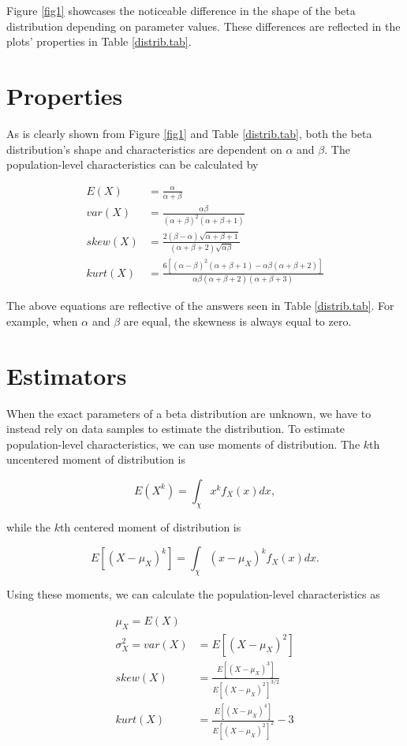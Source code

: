 \documentclass{article}\usepackage[]{graphicx}\usepackage[]{xcolor}
\begin{document}
\begin{multicols}{2}
Figure \ref{fig1} showcases the noticeable difference in the shape of the beta distribution depending on parameter values. These differences are reflected in the plots' properties in Table \ref{distrib.tab}. 


\section{Properties}
As is clearly shown from Figure \ref{fig1} and Table \ref{distrib.tab}, both the beta distribution's shape and characteristics are dependent on $\alpha$ and $\beta$. The population-level characteristics can be calculated by

\begin{align*}
E(X) &= \frac{\alpha}{\alpha + \beta} \tag{The Mean} \\
var(X) &= \frac{\alpha\beta}{(\alpha + \beta)^2(\alpha + \beta + 1)} \tag{The variance} \\
skew(X) &= \frac{2(\beta-\alpha)\sqrt{\alpha + \beta + 1}}{(\alpha + \beta + 2)\sqrt{\alpha\beta}} \tag{The Skewness} \\
kurt(X) &= \frac{6[(\alpha-\beta)^2(\alpha+\beta+1)-\alpha\beta(\alpha+\beta+2)]}{\alpha\beta(\alpha+\beta+2)(\alpha+\beta+3)} \tag{The Excess Kurtosis}
\end{align*}

The above equations are reflective of the answers seen in Table \ref{distrib.tab}. For example, when $\alpha$ and $\beta$ are equal, the skewness is always equal to zero.

\section{Estimators}
When the exact parameters of a beta distribution are unknown, we have to instead rely on data samples to estimate the distribution. To estimate population-level characteristics, we can use moments of distribution. The $k$th uncentered moment of distribution is 

\[E(X^k) = \int_\chi x^kf_X(x)dx,\]

while the $k$th centered moment of distribution is

\[E[(X-\mu_X)^k] = \int_\chi (x-\mu_X)^kf_X(x)dx.\]

Using these moments, we can calculate the population-level characteristics as

\begin{align*}
\mu_X = E(X) & \tag{The Mean} \\ 
\sigma^2_X = var(X) &= E[(X-\mu_X)^2] \tag{The Variance} \\
skew(X) &= \frac{E[(X-\mu_X)^3]}{E[(X-\mu_X)^2]^{3/2}} \tag{The Skewness} \\
kurt(X) &= \frac{E[(X-\mu_X)^4]}{E[(X-\mu_X)^2]^2}-3 \tag{The Excess Kurtosis}
\end{align*}


\end{multicols}
\end{document}
